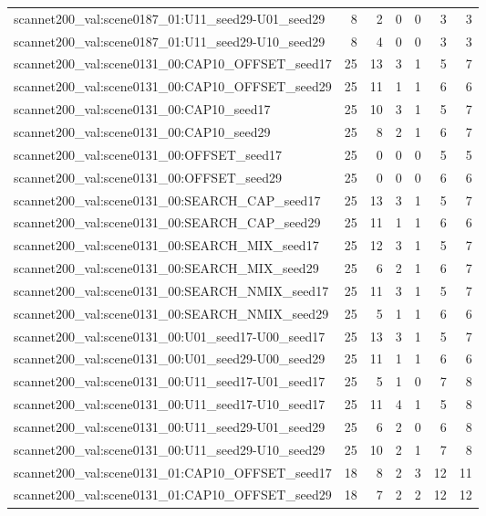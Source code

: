 \begin{table}[t]
\begin{tabular}{lrrrrrr}
scannet200\_val:scene0187\_01:U11\_seed29-U01\_seed29 & 8 & 2 & 0 & 0 & 3 & 3 \\
scannet200\_val:scene0187\_01:U11\_seed29-U10\_seed29 & 8 & 4 & 0 & 0 & 3 & 3 \\
scannet200\_val:scene0131\_00:CAP10\_OFFSET\_seed17 & 25 & 13 & 3 & 1 & 5 & 7 \\
scannet200\_val:scene0131\_00:CAP10\_OFFSET\_seed29 & 25 & 11 & 1 & 1 & 6 & 6 \\
scannet200\_val:scene0131\_00:CAP10\_seed17 & 25 & 10 & 3 & 1 & 5 & 7 \\
scannet200\_val:scene0131\_00:CAP10\_seed29 & 25 & 8 & 2 & 1 & 6 & 7 \\
scannet200\_val:scene0131\_00:OFFSET\_seed17 & 25 & 0 & 0 & 0 & 5 & 5 \\
scannet200\_val:scene0131\_00:OFFSET\_seed29 & 25 & 0 & 0 & 0 & 6 & 6 \\
scannet200\_val:scene0131\_00:SEARCH\_CAP\_seed17 & 25 & 13 & 3 & 1 & 5 & 7 \\
scannet200\_val:scene0131\_00:SEARCH\_CAP\_seed29 & 25 & 11 & 1 & 1 & 6 & 6 \\
scannet200\_val:scene0131\_00:SEARCH\_MIX\_seed17 & 25 & 12 & 3 & 1 & 5 & 7 \\
scannet200\_val:scene0131\_00:SEARCH\_MIX\_seed29 & 25 & 6 & 2 & 1 & 6 & 7 \\
scannet200\_val:scene0131\_00:SEARCH\_NMIX\_seed17 & 25 & 11 & 3 & 1 & 5 & 7 \\
scannet200\_val:scene0131\_00:SEARCH\_NMIX\_seed29 & 25 & 5 & 1 & 1 & 6 & 6 \\
scannet200\_val:scene0131\_00:U01\_seed17-U00\_seed17 & 25 & 13 & 3 & 1 & 5 & 7 \\
scannet200\_val:scene0131\_00:U01\_seed29-U00\_seed29 & 25 & 11 & 1 & 1 & 6 & 6 \\
scannet200\_val:scene0131\_00:U11\_seed17-U01\_seed17 & 25 & 5 & 1 & 0 & 7 & 8 \\
scannet200\_val:scene0131\_00:U11\_seed17-U10\_seed17 & 25 & 11 & 4 & 1 & 5 & 8 \\
scannet200\_val:scene0131\_00:U11\_seed29-U01\_seed29 & 25 & 6 & 2 & 0 & 6 & 8 \\
scannet200\_val:scene0131\_00:U11\_seed29-U10\_seed29 & 25 & 10 & 2 & 1 & 7 & 8 \\
scannet200\_val:scene0131\_01:CAP10\_OFFSET\_seed17 & 18 & 8 & 2 & 3 & 12 & 11 \\
scannet200\_val:scene0131\_01:CAP10\_OFFSET\_seed29 & 18 & 7 & 2 & 2 & 12 & 12 \\

\end{tabular}
\end{table}
